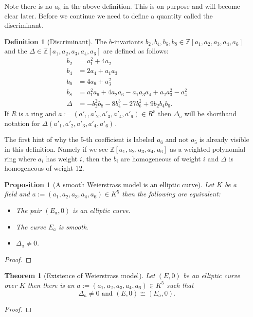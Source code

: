 \documentclass[a4paper,12pt,reqno]{amsart}
\newcommand{\field}[1]{\mathbb{#1}}  %
\newcommand{\Z}{\field{Z}} %
\newtheorem{theorem}[lemma]{Theorem}
\newtheorem{proposition}[lemma]{Proposition}
\theoremstyle{definition}
\newtheorem{definition}[lemma]{Definition}
\numberwithin{lemma}{section}
\numberwithin{equation}{section}
\numberwithin{figure}{section}
\begin{document}
Note there is no $a_5$ in the above definition. This is on purpose and will become clear later.
Before we continue we need to define a quantity called the discriminant.
\begin{definition}[Discriminant]\label{def:weierstrass-discriminant}
The $b$-invariants $b_2,b_4,b_6,b_8 \in \Z[a_1,a_2,a_3,a_4,a_6]$ and the  $\Delta \in \Z[a_1,a_2,a_3,a_4,a_6]$ are defined as follows:
\begin{align*}
b_2 &= a_1^2 + 4 a_2 \\
b_4 &= 2a_4 + a_1 a_3 \\
b_6 &=  4 a_6 +a_3^2 \\
b_8 &= a_1^2 a_6 + 4a_2 a_6 - a_1 a_3 a_4 + a_2 a_3^2 - a_4^2 \\
\Delta &= -b_2^2 b_8 - 8b_4^3 - 27b_6^2 + 9b_2 b_4 b_6.
\end{align*}
If $R$ is a ring and $a := (a'_1,a'_2,a'_3,a'_4,a'_6) \in R^5$ then $\Delta_a$ will be shorthand notation for $\Delta(a'_1,a'_2,a'_3,a'_4,a'_6)$.
\end{definition}
The first hint of why the $5$-th coefficient is labeled $a_6$ and not $a_5$ is already visible in this definition. Namely if we see $\Z[a_1,a_2,a_3,a_4,a_6]$ as a weighted polynomial ring where $a_i$ has weight $i$, then the $b_i$ are homogeneous of weight $i$ and $\Delta$ is homogeneous of weight $12$.

\begin{proposition}[A smooth Weierstrass model is an elliptic curve]\label{stmt:smooth-weierstrass-over-k-is-ec}
Let $K$ be a field and $a :=  (a_1,a_2,a_3,a_4,a_6) \in K^5$ then the following are equivalent:
\begin{itemize}[label=-]
	\item The pair $(E_{a},0)$ is an elliptic curve.
	\item The curve $E_{a}$ is smooth.
    \item $\Delta_a \neq 0$.
\end{itemize}
\end{proposition}
\begin{proof}
\end{proof}



\begin{theorem}[Existence of Weierstrass model]\label{stmt:ec-over-k-has-weierstrass-model}
Let $(E,0)$ be an elliptic curve over $K$ then there is an $a := (a_1,a_2,a_3,a_4,a_6) \in K^5$ such that
$$\Delta_{a} \neq 0 \text{ and } (E,0) \cong (E_{a},0).$$
\end{theorem}
\begin{proof}
\end{proof}
\end{document}
